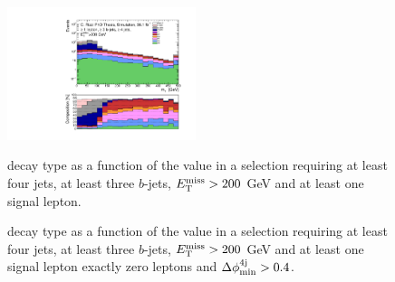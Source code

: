 \begin{figure}[h!]
\centering 
\includegraphics[width=0.49\textwidth]{figures/susy_common/mc_stack_mT_1L_3b_tt_dec.pdf}
\caption{\ttbar decay type as a function of the \mt value  in a selection requiring at least four jets, at least three $b$-jets, $E_{\rm T}^{\mathrm{miss}}>200$ GeV and at least one signal lepton.}\label{fig:ttbar_decay_mT_1L}

\caption{\ttbar decay type as a function of the \mtb value  in a selection requiring at least four jets, at least three $b$-jets, $E_{\rm T}^{\mathrm{miss}}>200$ GeV and  at least one signal lepton  exactly zero leptons and $\Delta\phi_{\rm{min}}^{4{\rm{j}}} > 0.4$.}\label{fig:ttbar_decay_mTb_min}
\end{figure}

